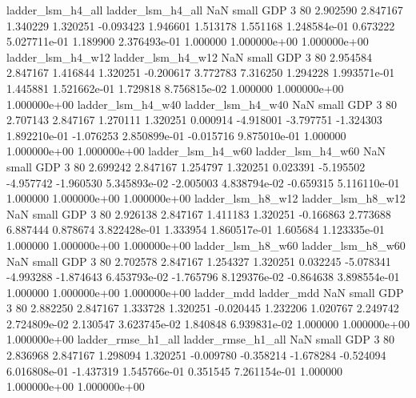        ladder_lsm_h4_all        ladder_lsm_h4_all                   NaN      small      GDP                 3 80 2.902590       2.847167 1.340229       1.320251   -0.093423      1.946601      1.513178     1.551168   1.248584e-01  0.673222 5.027711e-01     1.189900   2.376493e-01            1.000000    1.000000e+00        1.000000e+00
       ladder_lsm_h4_w12        ladder_lsm_h4_w12                   NaN      small      GDP                 3 80 2.954584       2.847167 1.416844       1.320251   -0.200617      3.772783      7.316250     1.294228   1.993571e-01  1.445881 1.521662e-01     1.729818   8.756815e-02            1.000000    1.000000e+00        1.000000e+00
       ladder_lsm_h4_w40        ladder_lsm_h4_w40                   NaN      small      GDP                 3 80 2.707143       2.847167 1.270111       1.320251    0.000914     -4.918001     -3.797751    -1.324303   1.892210e-01 -1.076253 2.850899e-01    -0.015716   9.875010e-01            1.000000    1.000000e+00        1.000000e+00
       ladder_lsm_h4_w60        ladder_lsm_h4_w60                   NaN      small      GDP                 3 80 2.699242       2.847167 1.254797       1.320251    0.023391     -5.195502     -4.957742    -1.960530   5.345893e-02 -2.005003 4.838794e-02    -0.659315   5.116110e-01            1.000000    1.000000e+00        1.000000e+00
       ladder_lsm_h8_w12        ladder_lsm_h8_w12                   NaN      small      GDP                 3 80 2.926138       2.847167 1.411183       1.320251   -0.166863      2.773688      6.887444     0.878674   3.822428e-01  1.333954 1.860517e-01     1.605684   1.123335e-01            1.000000    1.000000e+00        1.000000e+00
       ladder_lsm_h8_w60        ladder_lsm_h8_w60                   NaN      small      GDP                 3 80 2.702578       2.847167 1.254327       1.320251    0.032245     -5.078341     -4.993288    -1.874643   6.453793e-02 -1.765796 8.129376e-02    -0.864638   3.898554e-01            1.000000    1.000000e+00        1.000000e+00
              ladder_mdd               ladder_mdd                   NaN      small      GDP                 3 80 2.882250       2.847167 1.333728       1.320251   -0.020445      1.232206      1.020767     2.249742   2.724809e-02  2.130547 3.623745e-02     1.840848   6.939831e-02            1.000000    1.000000e+00        1.000000e+00
      ladder_rmse_h1_all       ladder_rmse_h1_all                   NaN      small      GDP                 3 80 2.836968       2.847167 1.298094       1.320251   -0.009780     -0.358214     -1.678284    -0.524094   6.016808e-01 -1.437319 1.545766e-01     0.351545   7.261154e-01            1.000000    1.000000e+00        1.000000e+00
